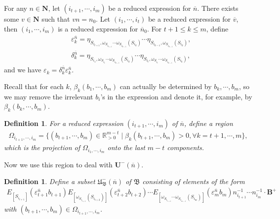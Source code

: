\documentclass[12pt]{amsart}
\newtheorem{definition}[theorem]{Definition}
\begin{document}
For any $n\in \mathbf{N}$, let $(i_{t+1},\cdots,i_m)$ be a reduced expression for $\overline{n}$.
There exists some $v\in \mathbf{N}$ such that $vn=n_0$.
Let $(i_1,\cdots,i_t)$ be a reduced expression for $\overline{v}$, then $(i_1,\cdots,i_m)$ is a reduced expression for $\overline{n}_0$.
For $t+1\leq k\leq m$, define  
\begin{align*}
    &\varepsilon_k^{\overline{n}}=\eta_{S_{i_{t+1}},\omega_{S_{i_{t+1}}}\cdots\omega_{S_{i_{k-1}}}(S_{i_k})} \cdots \eta_{S_{i_{k-1}},\omega_{S_{i_{k-1}}}(S_{i_k})},\\
    &\delta_k^{\overline{n}}=\eta_{S_{i_{1}},\omega_{S_{i_{1}}}\cdots\omega_{S_{i_{k-1}}}(S_{i_k})} \cdots \eta_{S_{i_{t}},\omega_{S_{i_t}}\cdots \omega_{S_{i_{k-1}}}(S_{i_k})},
\end{align*}
and we have $\varepsilon_k=\delta_k^{\overline{n}}\varepsilon_k^{\overline{n}}$.

Recall that for each $k$, $\beta_k(b_1,\cdots,b_m)$ can actually be determined by $b_k,\cdots,b_m$, so we may remove the irrelevant $b_i$'s in the expression and denote it, for example, by $\beta_k(b_k,\cdots,b_m)$.

\begin{definition}
    For a reduced expression $(i_{t+1},\cdots,i_m)$ of $\overline{n}$, define a region 
    \begin{align*}
        \Omega_{i_{t+1},\cdots,i_m}=\{ (b_{t+1},\cdots,b_m)\in \mathbb{R}_{>0}^{m-t} \mid \beta_k(b_{t+1},\cdots,b_m)>0, \forall k=t+1,\cdots,m \},
    \end{align*}
    which is the projection of $\Omega_{i_1,\cdots,i_m}$ onto the last $m-t$ components.
\end{definition}

Now we use this region to deal with $\mathbf{U}^-(\overline{n})$.

\begin{definition}
    Define a subset $\mathfrak{U}^-_{\mathfrak{B}}(\overline{n})$ of $\mathfrak{B}$ consisting of elements of the form 
\begin{align*}
  E_{[S_{i_{t+1}}]}(\varepsilon_{t+1}^{\overline{n}}b_{t+1}) E_{[\omega_{S_{i_{t+1}}}(S_{i_{t+2}})]}(\varepsilon_{t+2}^{\overline{n}}b_{t+2})  \cdots E_{[\omega_{S_{i_{t+1}}}\cdots\omega_{S_{i_{m-1}}}(S_{i_m})]}(\varepsilon_m^{\overline{n}}b_m)n_{i_{t+1}}^{-1}\cdots n_{i_m}^{-1}\cdot \mathbf{B}^+ 
\end{align*}
with $ (b_{t+1},\cdots,b_m)\in \Omega_{i_{t+1},\cdots,i_m} $.
\end{definition}
\end{document}
